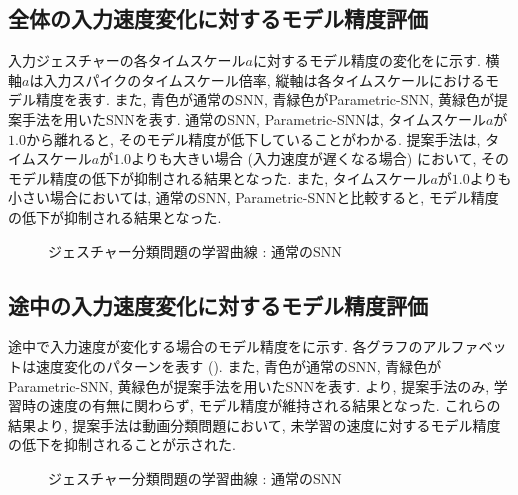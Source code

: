 \subsection{全体の入力速度変化に対するモデル精度評価}
入力ジェスチャーの各タイムスケール$a$に対するモデル精度の変化をに示す.
横軸$a$は入力スパイクのタイムスケール倍率, 縦軸は各タイムスケールにおけるモデル精度を表す.
また, 青色が通常のSNN, 青緑色がParametric-SNN, 黄緑色が提案手法を用いたSNNを表す.
通常のSNN, Parametric-SNNは, タイムスケール$a$が$1.0$から離れると, そのモデル精度が低下していることがわかる.
提案手法は, タイムスケール$a$が$1.0$よりも大きい場合 (入力速度が遅くなる場合) において, そのモデル精度の低下が抑制される結果となった.
また, タイムスケール$a$が$1.0$よりも小さい場合においては, 通常のSNN, Parametric-SNNと比較すると, モデル精度の低下が抑制される結果となった.
\begin{figure}[htb]
    \centering
    
    \caption{ジェスチャー分類問題の学習曲線 : 通常のSNN}
    \label{fig:result2:2}
\end{figure}


\subsection{途中の入力速度変化に対するモデル精度評価}
途中で入力速度が変化する場合のモデル精度をに示す.
各グラフのアルファベットは速度変化のパターンを表す ().
また, 青色が通常のSNN, 青緑色がParametric-SNN, 黄緑色が提案手法を用いたSNNを表す.
より, 提案手法のみ, 学習時の速度の有無に関わらず, モデル精度が維持される結果となった.
これらの結果より, 提案手法は動画分類問題において, 未学習の速度に対するモデル精度の低下を抑制されることが示された.
\begin{figure}[htb]
    \centering
    
    \caption{ジェスチャー分類問題の学習曲線 : 通常のSNN}
    \label{fig:result2:2}
\end{figure}

